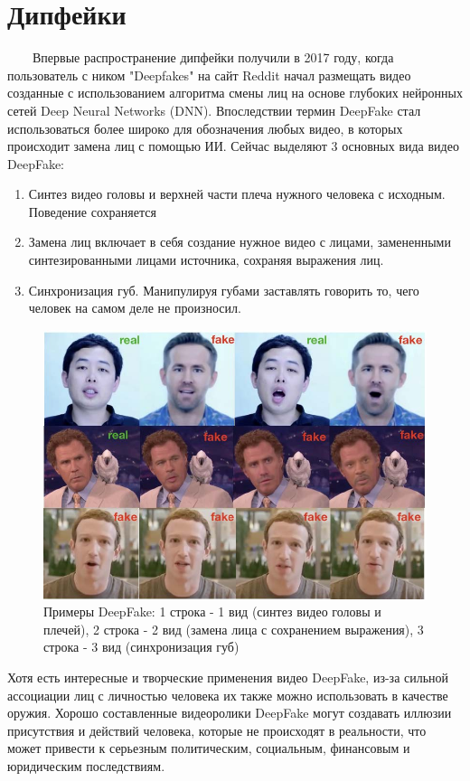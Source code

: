 \documentclass[12pt]{article}
\begin{document}
    \section {Дипфейки}
        $\qquad$Впервые распространение дипфейки получили в 2017 году, когда пользователь с ником "Deepfakes" на сайт Reddit начал размещать видео созданные с использованием алгоритма смены лиц на основе глубоких нейронных сетей Deep Neural Networks (DNN). Впоследствии термин DeepFake стал использоваться более широко для обозначения любых видео, в которых происходит замена лиц с помощью ИИ. Сейчас выделяют 3 основных вида видео DeepFake: 
        \begin{enumerate}
            \item Синтез видео головы и верхней части плеча нужного человека с
            исходным. Поведение сохраняется
            \item Замена лиц включает в себя создание нужное видео с лицами,
            замененными синтезированными лицами источника, сохраняя выражения лиц.
            \item Синхронизация губ. Манипулируя губами заставлять говорить то, чего
            человек на самом деле не произносил.
       \end{enumerate}
        \begin{figure}[h!]
            \centering
            \includegraphics[width = 300 pt] {16.jpg}
            \caption{Примеры DeepFake: 1 строка - 1 вид (синтез видео головы и плечей), 2 строка - 2 вид (замена лица с сохранением выражения), 3 строка - 3 вид (синхронизация губ)}
        \end{figure}
        Хотя есть интересные и творческие применения видео DeepFake, из-за сильной ассоциации лиц с личностью человека их также можно использовать в качестве оружия. Хорошо составленные видеоролики DeepFake могут создавать иллюзии присутствия и действий человека, которые не происходят в реальности, что может привести к серьезным политическим, социальным, финансовым и юридическим последствиям.
\end{document}

